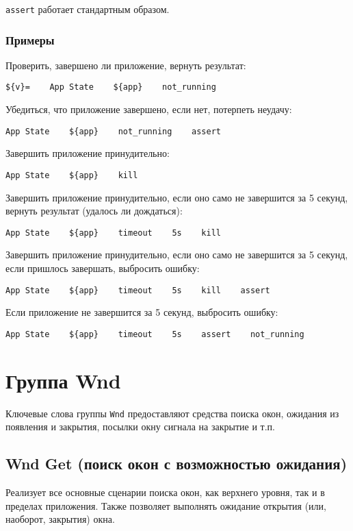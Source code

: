 \documentclass[11pt]{book} %
\begin{document}
\verb"assert" работает стандартным образом.

\subsubsection*{Примеры}

Проверить, завершено ли приложение, вернуть результат:
\begin{verbatim}${v}=    App State    ${app}    not_running\end{verbatim}

Убедиться, что приложение завершено, если нет, потерпеть неудачу:
\begin{verbatim}App State    ${app}    not_running    assert\end{verbatim}

Завершить приложение принудительно:
\begin{verbatim}App State    ${app}    kill\end{verbatim}

Завершить приложение принудительно, если оно само не завершится за 5 секунд, вернуть результат (удалось ли дождаться):
\begin{verbatim}App State    ${app}    timeout    5s    kill\end{verbatim}

Завершить приложение принудительно, если оно само не завершится за 5 секунд, если пришлось завершать, выбросить ошибку:
\begin{verbatim}App State    ${app}    timeout    5s    kill    assert\end{verbatim}

Если приложение не завершится за 5 секунд, выбросить ошибку:
\begin{verbatim}App State    ${app}    timeout    5s    assert    not_running\end{verbatim}


\section{Группа Wnd}
Ключевые слова группы \verb"Wnd" предоставляют средства поиска окон, ожидания из появления и закрытия, посылки окну сигнала на закрытие и т.п.


\subsection{Wnd Get (поиск окон с возможностью ожидания)}
Реализует все основные сценарии поиска окон, как верхнего уровня, так и в пределах приложения. Также позволяет выполнять ожидание открытия (или, наоборот, закрытия) окна.
\end{document}
